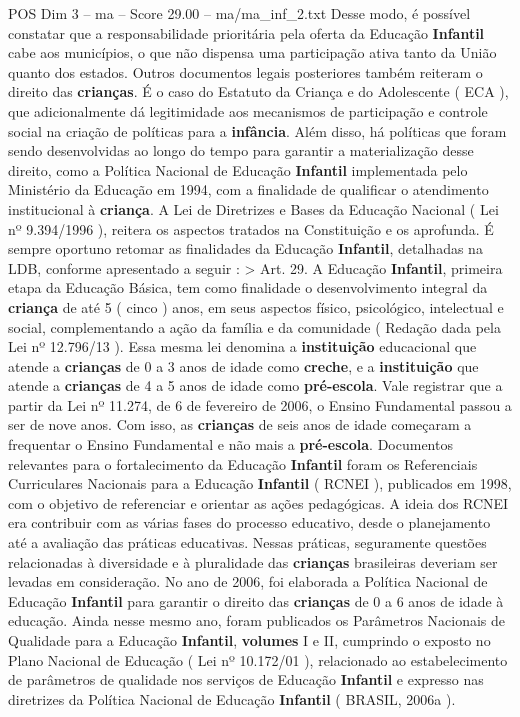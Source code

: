 \begin{textsample}{POS Dim 3 – ma – Score 29.00 – ma/ma\_inf\_2.txt}
Desse modo, é possível constatar que a responsabilidade prioritária pela oferta da Educação \textbf{Infantil} cabe aos municípios, o que não dispensa uma participação ativa tanto da União quanto dos estados.
Outros documentos legais posteriores também reiteram o direito das \textbf{crianças}.
É o caso do Estatuto da Criança e do Adolescente ( ECA ), que adicionalmente dá legitimidade aos mecanismos de participação e controle social na criação de políticas para a \textbf{infância}.
Além disso, há políticas que foram sendo desenvolvidas ao longo do tempo para garantir a materialização desse direito, como a Política Nacional de Educação \textbf{Infantil} implementada pelo Ministério da Educação em 1994, com a finalidade de qualificar o atendimento institucional à \textbf{criança}.
A Lei de Diretrizes e Bases da Educação Nacional ( Lei nº 9.394/1996 ), reitera os aspectos tratados na Constituição e os aprofunda.
É sempre oportuno retomar as finalidades da Educação \textbf{Infantil}, detalhadas na LDB, conforme apresentado a seguir : > Art. 29.
A Educação \textbf{Infantil}, primeira etapa da Educação Básica, tem como finalidade o desenvolvimento integral da \textbf{criança} de até 5 ( cinco ) anos, em seus aspectos físico, psicológico, intelectual e social, complementando a ação da família e da comunidade ( Redação dada pela Lei nº 12.796/13 ).
Essa mesma lei denomina a \textbf{instituição} educacional que atende a \textbf{crianças} de 0 a 3 anos de idade como \textbf{creche}, e a \textbf{instituição} que atende a \textbf{crianças} de 4 a 5 anos de idade como \textbf{pré-escola}.
Vale registrar que a partir da Lei nº 11.274, de 6 de fevereiro de 2006, o Ensino Fundamental passou a ser de nove anos.
Com isso, as \textbf{crianças} de seis anos de idade começaram a frequentar o Ensino Fundamental e não mais a \textbf{pré-escola}.
Documentos relevantes para o fortalecimento da Educação \textbf{Infantil} foram os Referenciais Curriculares Nacionais para a Educação \textbf{Infantil} ( RCNEI ), publicados em 1998, com o objetivo de referenciar e orientar as ações pedagógicas.
A ideia dos RCNEI era contribuir com as várias fases do processo educativo, desde o planejamento até a avaliação das práticas educativas.
Nessas práticas, seguramente questões relacionadas à diversidade e à pluralidade das \textbf{crianças} brasileiras deveriam ser levadas em consideração.
No ano de 2006, foi elaborada a Política Nacional de Educação \textbf{Infantil} para garantir o direito das \textbf{crianças} de 0 a 6 anos de idade à educação.
Ainda nesse mesmo ano, foram publicados os Parâmetros Nacionais de Qualidade para a Educação \textbf{Infantil}, \textbf{volumes} I e II, cumprindo o exposto no Plano Nacional de Educação ( Lei nº 10.172/01 ), relacionado ao estabelecimento de parâmetros de qualidade nos serviços de Educação \textbf{Infantil} e expresso nas diretrizes da Política Nacional de Educação \textbf{Infantil} ( BRASIL, 2006a ).

\end{textsample}
